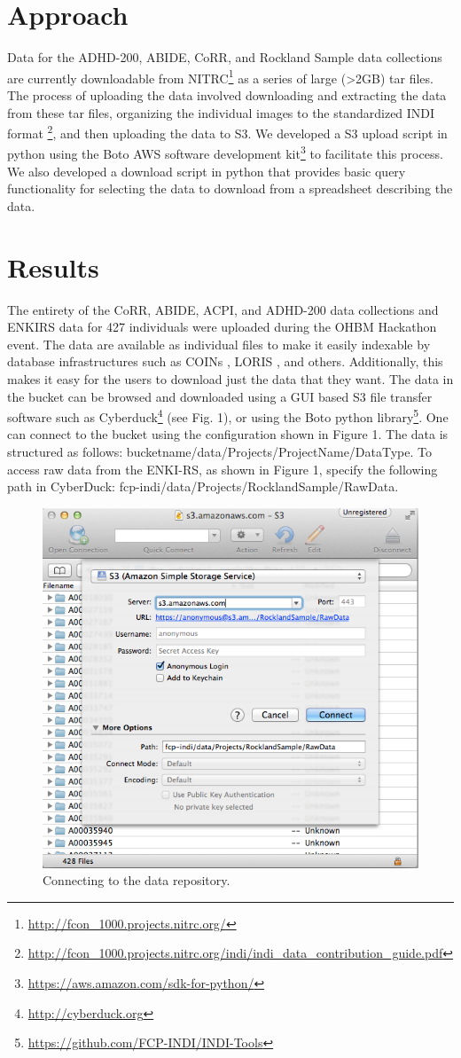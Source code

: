 \documentclass[twocolumn]{bmcart}%
\begin{document}
\section{Approach}\label{approach}

Data for the ADHD-200, ABIDE, CoRR, and Rockland Sample data collections
are currently downloadable from
NITRC\footnote{\url{http://fcon_1000.projects.nitrc.org/}} as a series
of large (\textgreater{}2GB) tar files. The process of uploading the
data involved downloading and extracting the data from these tar files,
organizing the individual images to the standardized INDI format
\footnote{\url{http://fcon_1000.projects.nitrc.org/indi/indi_data_contribution_guide.pdf}},
and then uploading the data to S3. We developed a S3 upload script in
python using the Boto AWS software development
kit\footnote{\url{https://aws.amazon.com/sdk-for-python/}} to facilitate
this process. We also developed a download script in python that
provides basic query functionality for selecting the data to download
from a spreadsheet describing the data.

\section{Results}\label{results}

The entirety of the CoRR, ABIDE, ACPI, and ADHD-200 data collections and
ENKIRS data for 427 individuals were uploaded during the OHBM Hackathon
event. The data are available as individual files to make it easily
indexable by database infrastructures such as COINs \cite{landis2016},
LORIS \cite{Das2011}, and others. Additionally, this makes it easy for
the users to download just the data that they want. The data in the
bucket can be browsed and downloaded using a GUI based S3 file transfer
software such as Cyberduck\footnote{\url{http://cyberduck.org}} (see
Fig. 1), or using the Boto python
library\footnote{\url{https://github.com/FCP-INDI/INDI-Tools}}. One can
connect to the bucket using the configuration shown in Figure 1. The
data is structured as follows:
bucketname/data/Projects/ProjectName/DataType. To access raw data from
the ENKI-RS, as shown in Figure 1, specify the following path in
CyberDuck: fcp-indi/data/Projects/RocklandSample/RawData.

\begin{figure}[h!]
  \includegraphics[width=.47\textwidth]{cyberduck_screenshot.png}
  \caption{\label{centfig} Connecting to the data repository.}
\end{figure}
\end{document}
